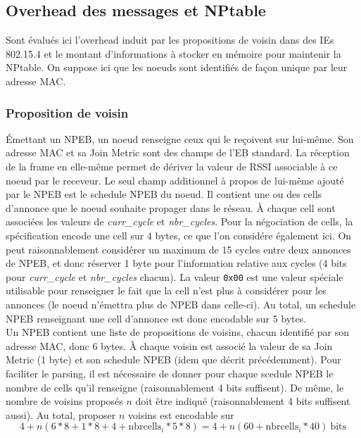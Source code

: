 \documentclass[]{report}
\begin{document}
\subsection{Overhead des messages et NPtable}

Sont évalués ici l'overhead induit par les propositions de voisin dans des IEs 802.15.4 et le montant d'informations à stocker en mémoire pour maintenir la NPtable. On suppose ici que les noeuds sont identifiés de façon unique par leur adresse MAC.

\subsubsection{Proposition de voisin}
\label{size_prop}

Émettant un NPEB, un noeud renseigne ceux qui le reçoivent sur lui-même. Son adresse MAC et sa Join Metric sont des champs de l'EB standard. La réception de la frame en elle-même permet de dériver la valeur de RSSI associable à ce noeud par le receveur. Le seul champ additionnel à propos de lui-même ajouté par le NPEB est le schedule NPEB du noeud. Il contient une ou des cells d'annonce que le noeud souhaite propager dans le réseau. À chaque cell sont associées les valeurs de \textit{curr\_cycle} et \textit{nbr\_cycles}. Pour la négociation de cells, la spécification \cite{rfc8480} encode une cell sur 4 bytes, ce que l'on considére également ici. On peut raisonnablement considérer un maximum de 15 cycles entre deux annonces de NPEB, et donc réserver 1 byte pour l'information relative aux cycles (4 bits pour \textit{curr\_cycle} et \textit{nbr\_cycles} chacun). La valeur \texttt{0x00} est une valeur spéciale utilisable pour renseigner le fait que la cell n'est plus à considérer pour les annonces (le noeud n'émettra plus de NPEB dans celle-ci). Au total, un schedule NPEB renseignant une cell d'annonce est donc encodable sur 5 bytes.\\

Un NPEB contient une liste de propositions de voisins, chacun identifié par son adresse MAC, donc 6 bytes. À chaque voisin est associé la valeur de sa Join Metric (1 byte) et son schedule NPEB (idem que décrit précédemment). Pour faciliter le parsing, il est nécessaire de donner pour chaque scedule NPEB le nombre de cells qu'il renseigne (raisonnablement 4 bits suffisent). De même, le nombre de voisins proposés $n$ doit être indiqué (raisonnablement 4 bits suffisent aussi). Au total, proposer $n$ voisins est encodable sur
 \[ 4+n (6*8 + 1*8 + 4 + \text{nbrcells}_{i}*5*8) 
 = 4 + n(60+\text{nbrcells}_{i}*40)\ \text{bits} \]
 
\end{document}
